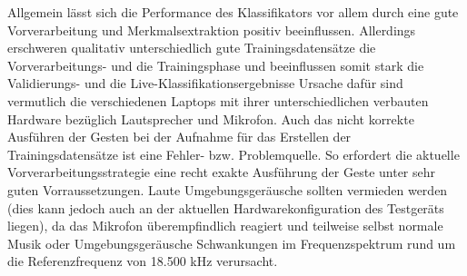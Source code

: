 Allgemein lässt sich die Performance des Klassifikators vor allem durch eine gute Vorverarbeitung und Merkmalsextraktion positiv beeinflussen.
Allerdings erschweren qualitativ unterschiedlich gute Trainingsdatensätze die Vorverarbeitungs- und die Trainingsphase und beeinflussen somit stark die Validierungs- und die Live-Klassifikationsergebnisse
Ursache dafür sind vermutlich die verschiedenen Laptops mit ihrer unterschiedlichen verbauten Hardware bezüglich Lautsprecher und Mikrofon.
Auch das nicht korrekte Ausführen der Gesten bei der Aufnahme für das Erstellen der Trainingsdatensätze ist eine Fehler- bzw. Problemquelle.
So erfordert die aktuelle Vorverarbeitungsstrategie eine recht exakte Ausführung der Geste unter sehr guten Vorraussetzungen.
Laute Umgebungsgeräusche sollten vermieden werden (dies kann jedoch auch an der aktuellen Hardwarekonfiguration des Testgeräts liegen), da das Mikrofon überempfindlich reagiert und teilweise selbst normale Musik oder Umgebungsgeräusche Schwankungen im Frequenzspektrum rund um die Referenzfrequenz von 18.500 kHz verursacht.
